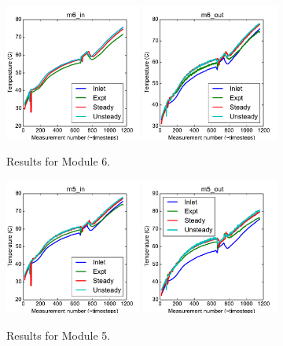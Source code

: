 \documentclass{article}
\begin{document}
\begin{figure}[!ht]
\centering
\includegraphics[width=0.4\textwidth]{../../data/ICSolar/images/Jan28_m6_in_compare.pdf}\hspace{0.05\textwidth}
\includegraphics[width=0.4\textwidth]{../../data/ICSolar/images/Jan28_m6_out_compare.pdf}\hspace{0.05\textwidth}\\
\caption{Results for Module 6.}\end{figure}
\begin{figure}[!ht]
\centering
\includegraphics[width=0.4\textwidth]{../../data/ICSolar/images/Jan28_m5_in_compare.pdf}\hspace{0.05\textwidth}
\includegraphics[width=0.4\textwidth]{../../data/ICSolar/images/Jan28_m5_out_compare.pdf}\hspace{0.05\textwidth}\\
\caption{Results for Module 5.}\end{figure}
\end{document}
